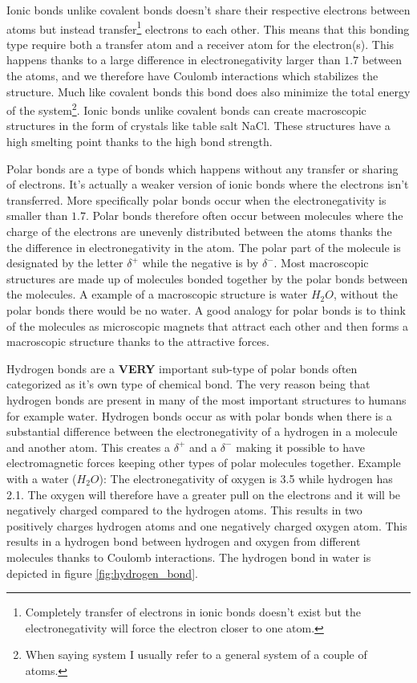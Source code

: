\documentclass[jmp, amsmath, amssymb, reprint]{article}
\numberwithin{equation}{section}
\begin{document}
\begin{multicols}{2}
Ionic bonds unlike covalent bonds doesn't share their respective electrons between atoms but instead transfer\footnote{Completely transfer of electrons in ionic bonds doesn't exist but the electronegativity will force the electron closer to one atom.} electrons to each other. This means that this bonding type require both a transfer atom and a receiver atom for the electron(s). This happens thanks to a large difference in electronegativity larger than \(1.7\) between the atoms, and we therefore have Coulomb interactions which stabilizes the structure. Much like covalent bonds this bond does also minimize the total energy of the system\footnote{When saying system I usually refer to a general system of a couple of atoms.}. Ionic bonds unlike covalent bonds can create macroscopic structures in the form of crystals like table salt NaCl. These structures have a high smelting point thanks to the high bond strength.

Polar bonds are a type of bonds which happens without any transfer or sharing of electrons. It's actually a weaker version of ionic bonds where the electrons isn't transferred. More specifically polar bonds occur when the electronegativity is smaller than \(1.7\). Polar bonds therefore often occur between molecules where the charge of the electrons are unevenly distributed between the atoms thanks the the difference in electronegativity in the atom. The polar part of the molecule is designated by the letter \(\delta^+\) while the negative is by \(\delta^-\). Most macroscopic structures are made up of molecules bonded together by the polar bonds between the molecules. A example of a macroscopic structure is water \(H_2O\), without the polar bonds there would be no water. A good analogy for polar bonds is to think of the molecules as microscopic magnets that attract each other and then forms a macroscopic structure thanks to the attractive forces. 

Hydrogen bonds are a \textbf{VERY} important sub-type of polar bonds often categorized as it's own type of chemical bond. The very reason being that hydrogen bonds are present in many of the most important structures to humans for example water. Hydrogen bonds occur as with polar bonds when there is a substantial difference between the electronegativity of a hydrogen in a molecule and another atom. This creates a \(\delta^+\) and a \(\delta^-\) making it possible to have electromagnetic forces keeping other types of polar molecules together. Example with a water (\(H_2O\)): The electronegativity of oxygen is 3.5 while hydrogen has 2.1. The oxygen will therefore have a greater pull on the electrons and it will be negatively charged compared to the hydrogen atoms. This results in two positively charges hydrogen atoms and one negatively charged oxygen atom. This results in a hydrogen bond between hydrogen and oxygen from different molecules thanks to Coulomb interactions. The hydrogen bond in water is depicted in figure \ref{fig:hydrogen_bond}.


\end{multicols}
\end{document}
